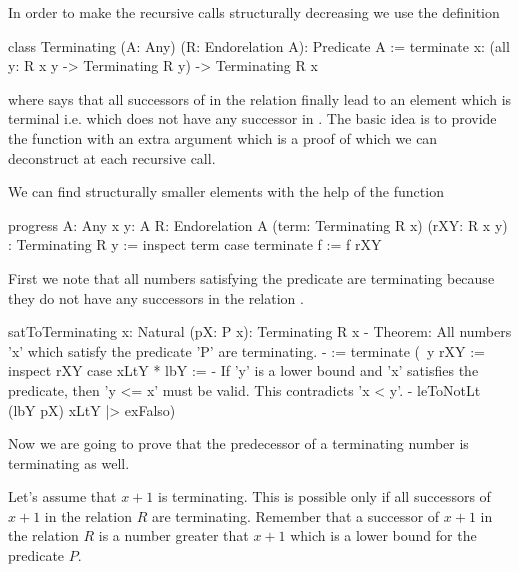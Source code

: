 In order to make the recursive calls structurally decreasing we use the
definition
%
\begin{alba}
    class
        Terminating (A: Any) (R: Endorelation A): Predicate A
    :=
        terminate {x}:
            (all {y}: R x y -> Terminating R y)
            -> Terminating R x
\end{alba}
%
where  says that all successors of  in the
relation  finally lead to an element which is terminal i.e. which does
not have any successor in . The basic idea is to provide the function
 with an extra argument which is a proof of  which we can deconstruct at each recursive call.

We can find structurally smaller elements with the help of the function

\begin{alba}
    progress
        {A: Any} {x y: A} {R: Endorelation A}
        (term: Terminating R x)
        (rXY: R x y)
        : Terminating R y
    :=
        inspect term case
            terminate f :=
                f rXY
\end{alba}





First we note that all numbers satisfying the predicate  are terminating
because they do not have any successors in the relation .

\begin{alba}
    satToTerminating {x: Natural} (pX: P x): Terminating R x
    {- Theorem: All numbers 'x' which satisfy the predicate 'P' are
       terminating. -}
    :=
        terminate
            (\ {y} rXY :=
                inspect rXY case
                    xLtY * lbY :=
                        {- If 'y' is a lower bound and 'x' satisfies the
                           predicate, then 'y <= x' must be valid. This
                           contradicts 'x < y'. -}
                        leToNotLt (lbY pX) xLtY |> exFalso)
\end{alba}



Now we are going to prove that the predecessor of a terminating number is
terminating as well.

Let's assume that $x + 1$ is terminating. This is possible only if all
successors of $x + 1$ in the relation $R$ are terminating. Remember that a
successor of $x + 1$ in the relation $R$ is a number greater that $x + 1$ which
is a lower bound for the predicate $P$.

